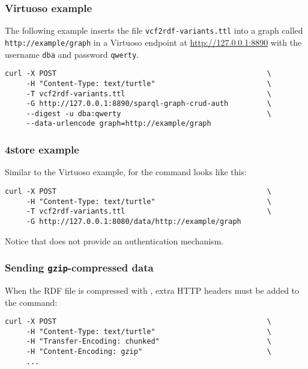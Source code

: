 \subsubsection{Virtuoso example}

\begin{sloppypar}
The following example inserts the file \texttt{vcf2rdf-variants.ttl} into
a graph called \texttt{http://example/graph} in a Virtuoso endpoint at
\url{http://127.0.0.1:8890} with the username \texttt{dba} and
password \texttt{qwerty}.
\end{sloppypar}

\begin{siderules}
\begin{verbatim}
curl -X POST                                                 \
     -H "Content-Type: text/turtle"                          \
     -T vcf2rdf-variants.ttl                                 \
     -G http://127.0.0.1:8890/sparql-graph-crud-auth         \
     --digest -u dba:qwerty                                  \
     --data-urlencode graph=http://example/graph
\end{verbatim}
\end{siderules}

\subsubsection{4store example}

Similar to the Virtuoso example, for  the command looks like
this:

\begin{siderules}
\begin{verbatim}
curl -X POST                                                 \
     -H "Content-Type: text/turtle"                          \
     -T vcf2rdf-variants.ttl                                 \
     -G http://127.0.0.1:8080/data/http://example/graph
\end{verbatim}
\end{siderules}

Notice that  does not provide an authentication mechanism.

\subsubsection{Sending \texttt{gzip}-compressed data}

  When the RDF file is compressed with \program{gzip}, extra HTTP headers must
  be added to the  command:
\begin{siderules}
\begin{verbatim}
curl -X POST                                                 \
     -H "Content-Type: text/turtle"                          \
     -H "Transfer-Encoding: chunked"                         \
     -H "Content-Encoding: gzip"                             \
     ...
\end{verbatim}
\end{siderules}
